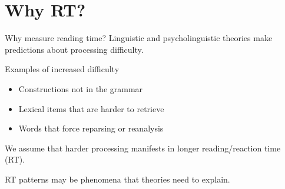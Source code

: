 \documentclass[ 12pt, xcolor=beamer,table,usenames,dvipsnames, ignorenonframetext, ngerman]{beamer}
\begin{document}
\section{Why RT?}
\begin{frame}{Why measure reading time?}
\pause
Linguistic and psycholinguistic theories make predictions about processing difficulty.
\medskip
\pause

Examples of increased difficulty
\begin{itemize}
	\item Constructions not in the grammar 
	\item Lexical items that are harder to retrieve 
	\item Words that force reparsing or reanalysis
\end{itemize}
\pause
\medskip 

We assume that harder processing manifests in longer reading/reaction time (RT).
\pause
\medskip

RT patterns may be phenomena that theories need to explain.




\end{frame}
\end{document}
